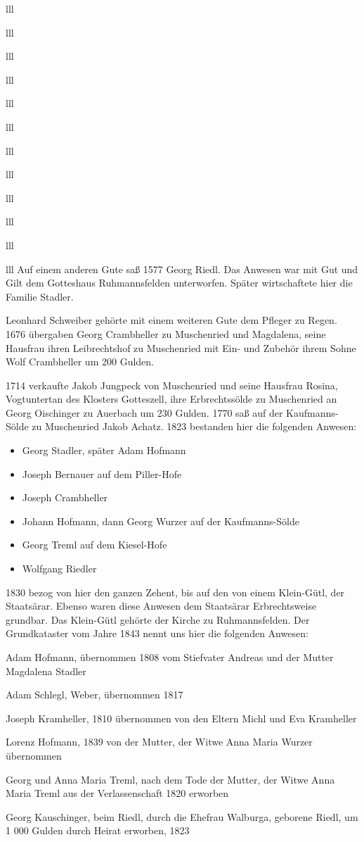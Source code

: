 \documentclass[12pt,a4pager]{book}
\begin{document}
\begin{tabuluar}{lll}
\begin{tabuluar}{lll}
\begin{tabuluar}{lll}
\begin{tabuluar}{lll}
\begin{tabuluar}{lll}
\begin{tabuluar}{lll}
\begin{tabuluar}{lll}
\begin{tabuluar}{lll}
\begin{tabuluar}{lll}
\begin{tabuluar}{lll}
\begin{tabuluar}{lll}
\begin{tabuluar}{lll}
Auf einem anderen Gute saß 1577 Georg Riedl. Das Anwesen war mit Gut und Gilt
dem Gotteshaus Ruhmannsfelden unterworfen. Später wirtschaftete hier die Familie
Stadler.

Leonhard Schweiber gehörte mit einem weiteren Gute dem Pfleger zu Regen. 1676
übergaben Georg Crambheller zu Muschenried und Magdalena, seine Hausfrau ihren
Leibrechtshof zu Muschenried mit Ein- und Zubehör ihrem Sohne Wolf Crambheller
um 200 Gulden.

1714 verkaufte Jakob Jungpeck von Muschenried und seine Hausfrau Rosina,
Vogtuntertan des Klosters Gotteszell, ihre Erbrechtssölde zu Muschenried an
Georg Oischinger zu Auerbach um 230 Gulden. 1770 saß auf der Kaufmanns-Sölde zu
Muschenried Jakob Achatz. 1823 bestanden hier die folgenden Anwesen:

\begin{itemize}
\item Georg Stadler, später Adam Hofmann
\item Joseph Bernauer auf dem Piller-Hofe
\item Joseph Crambheller
\item Johann Hofmann, dann Georg Wurzer auf der Kaufmanns-Sölde
\item Georg Treml auf dem Kiesel-Hofe
\item Wolfgang Riedler
\end{itemize}

1830 bezog von hier den ganzen Zehent, bis auf den von einem Klein-Gütl, der
Staatsärar. Ebenso waren diese Anwesen dem Staatsärar Erbrechtsweise grundbar.
Das Klein-Gütl gehörte der Kirche zu Ruhmannsfelden. Der Grundkataster vom Jahre
1843 nennt uns hier die folgenden Anwesen:

\begin{compactitem}
\item Adam Hofmann, übernommen 1808 vom Stiefvater Andreas und der Mutter
Magdalena Stadler
\item Adam Schlegl, Weber, übernommen 1817
\item Joseph Kramheller, 1810 übernommen von den Eltern Michl und Eva Kramheller
\item Lorenz Hofmann, 1839 von der Mutter, der Witwe Anna Maria Wurzer
übernommen
\item Georg und Anna Maria Treml, nach dem Tode der Mutter, der Witwe Anna Maria
Treml aus der Verlassenschaft 1820 erworben
\item Georg Kauschinger, beim Riedl, durch die Ehefrau Walburga, geborene Riedl,
um 1 000 Gulden durch Heirat erworben, 1823
\end{compactitem}


\end{tabuluar}
\end{tabuluar}
\end{tabuluar}
\end{tabuluar}
\end{tabuluar}
\end{tabuluar}
\end{tabuluar}
\end{tabuluar}
\end{tabuluar}
\end{tabuluar}
\end{tabuluar}
\end{tabuluar}
\end{document}
